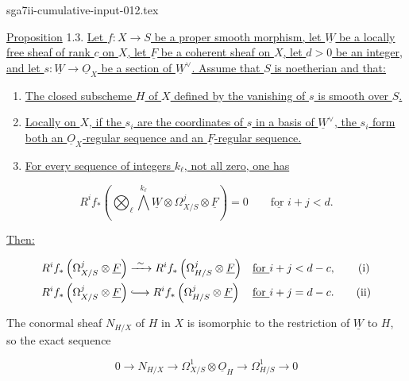 \begin{filecontents*}{sga7ii-cumulative-input-012.tex}

\underline{Proposition} 1.3. \underline{Let $f:X\to S$ be a proper smooth
morphism, let $\underline W$ be a locally free sheaf of rank $c$ on $X$,
let $\underline F$ be a coherent sheaf on $X$, let $d>0$ be an integer,
and let $s:\underline W\to\underline O_X$ be a section of
$\underline W^\vee$.  Assume that $S$ is noetherian and that:}

\begin{enumerate}[label=(\alph*),leftmargin=2.4em]
\item \underline{The closed subscheme $H$ of $X$ defined by the vanishing
of $s$ is smooth over $S$.}

\item \underline{Locally on $X$, if the $s_i$ are the coordinates of $s$
in a basis of $\underline W^\vee$, the $s_i$ form both an
$\underline O_X$-regular sequence and an $\underline F$-regular sequence.}

\item \underline{For every sequence of integers $k_\ell$, not all zero,
one has}
\end{enumerate}

\begin{equation*}
R^if_*\left(\bigotimes_\ell\bigwedge^{k_\ell}\underline W
\otimes\Omega^j_{X/S}\otimes\underline F\right)=0
\qquad\underline{\text{for }}i+j<d.
\end{equation*}

\underline{Then:}

\begin{align*}
R^if_*\left(\Omega^j_{X/S}\otimes\underline F\right)
&\xrightarrow{\ \sim\ }
R^if_*\left(\Omega^j_{H/S}\otimes\underline F\right)
&&\underline{\text{for }}i+j<d-c, \tag{i}\\
R^if_*\left(\Omega^j_{X/S}\otimes\underline F\right)
&\lhook\joinrel\longrightarrow
R^if_*\left(\Omega^j_{H/S}\otimes\underline F\right)
&&\underline{\text{for }}i+j=d-c. \tag{ii}
\end{align*}

The conormal sheaf $N_{H/X}$ of $H$ in $X$ is isomorphic to the restriction
of $\underline W$ to $H$, so the exact sequence

\begin{equation}\tag{1.3.1}
0\longrightarrow N_{H/X}\longrightarrow
\Omega^1_{X/S}\otimes\underline O_H\longrightarrow
\Omega^1_{H/S}\longrightarrow0
\end{equation}


\end{filecontents*}
